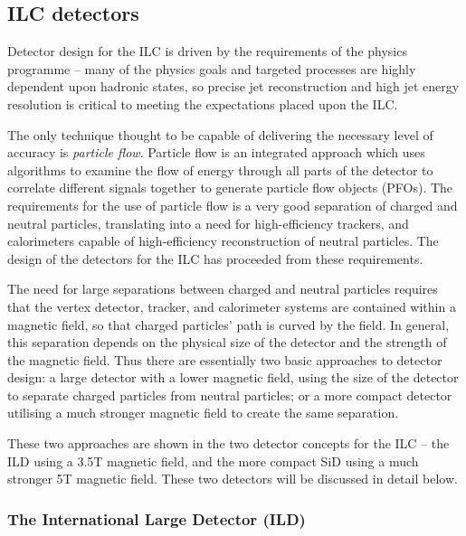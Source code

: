 \subsection{ILC detectors}
\label{section:ILC-detectors}
Detector design for the \acrshort{ILC} is driven by the requirements of the physics programme -- many of the physics goals and targeted processes are highly dependent upon hadronic states, so precise jet reconstruction and high jet energy resolution is critical to meeting the expectations placed upon the \acrshort{ILC}. 

The only technique thought to be capable of delivering the necessary level of accuracy is \textit{particle flow}. Particle flow is an integrated approach which uses algorithms to examine the flow of energy through all parts of the detector to correlate different signals together to generate particle flow objects (\acrshort{PFO}s). The requirements for the use of particle flow is a very good separation of charged and neutral particles, translating into a need for high-efficiency trackers, and calorimeters capable of high-efficiency reconstruction of neutral particles. The design of the detectors for the \acrshort{ILC} has proceeded from these requirements.

The need for large separations between charged and neutral particles requires that the vertex detector, tracker, and calorimeter systems are contained within a magnetic field, so that charged particles' path is curved by the field. In general, this separation depends on the physical size of the detector and the strength of the magnetic field. Thus there are essentially two basic approaches to detector design: a large detector with a lower magnetic field, using the size of the detector to separate charged particles from neutral particles; or a more compact detector utilising a much stronger magnetic field to create the same separation.

These two approaches are shown in the two detector concepts for the \acrshort{ILC} -- the \acrlong{ILD} using a 3.5T magnetic field, and the more compact \acrlong{SiD} using a much stronger 5T magnetic field. These two detectors will be discussed in detail below.

\subsubsection{The International Large Detector (ILD)}

